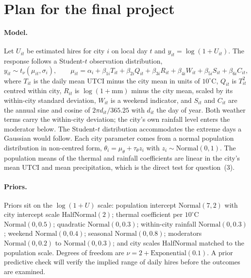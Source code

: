 \documentclass{article}
\begin{document}
\section{Plan for the final project}
\label{sec:plan}

\paragraph{Model.} Let $U_{it}$ be estimated hires for city $i$ on local day $t$
and $y_{it}=\log(1+U_{it})$. The response follows a Student-$t$ observation
distribution,
\[
  y_{it}\sim t_{\nu}\!\left(\mu_{it},\sigma_i\right),
  \qquad
  \mu_{it}=\alpha_i+\beta_{1i}T_{it}+\beta_{2i}Q_{it}+\beta_{3i}R_{it}
  +\beta_{4i}W_{it}+\beta_{5i}S_{it}+\beta_{6i}C_{it},
\]
where $T_{it}$ is the daily mean UTCI minus the city mean in units of
$10^\circ$C, $Q_{it}$ is $T_{it}^2$ centred within city, $R_{it}$ is
$\log(1+\text{mm})$ minus the city mean, scaled by its within-city standard
deviation, $W_{it}$ is a weekend indicator, and $S_{it}$
and $C_{it}$ are the annual sine and cosine of $2\pi d_{it}/365.25$ with $d_{it}$
the day of year. Both weather terms carry the within-city deviation; the city's
own rainfall level enters the moderator below. The
Student-$t$ distribution accommodates the extreme days a
Gaussian would follow. Each city parameter comes from a normal population
distribution in non-centred form, $\theta_i=\mu_\theta+\tau_\theta z_i$ with
$z_i\sim\text{Normal}(0,1)$. The population means of the thermal
and rainfall coefficients are linear in the city's mean UTCI and mean
precipitation, which is the direct test for question~(3).

\paragraph{Priors.} Priors sit on the $\log(1+U)$ scale: population intercept
$\text{Normal}(7,2)$ with city intercept scale $\text{HalfNormal}(2)$; thermal
coefficient per $10^\circ$C $\text{Normal}(0,0.5)$; quadratic
$\text{Normal}(0,0.3)$; within-city rainfall $\text{Normal}(0,0.3)$; weekend
$\text{Normal}(0,0.4)$; seasonal $\text{Normal}(0,0.8)$; moderators
$\text{Normal}(0,0.2)$ to $\text{Normal}(0,0.3)$; and city scales HalfNormal
matched to the population scale. Degrees of freedom are
$\nu=2+\text{Exponential}(0.1)$. A prior predictive check will verify the implied
range of daily hires before the outcomes are examined.
\end{document}
